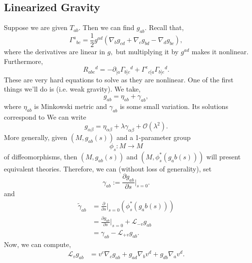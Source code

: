 \documentclass{article}
\numberwithin{equation}{section}
\begin{document}
\subsection{Linearized Gravity}
Suppose we are given $T_{ab}.$ Then we can find $g_{ab}.$ Recall that,
\begin{equation*}
    \Gamma^a{}_{bc} = \frac{1}{2}g^{ad}\left(\nabla_b g_{cd} + \nabla_c g_{bd} - \nabla_d g_{bc}\right),
\end{equation*}
where the derivatives are linear in $g,$ but multiplying it by $g^{ad}$ makes it nonlinear. Furthermore,
\begin{equation*}
    R_{abc}{}^d = -\partial_{[a}\Gamma_{b]c}{}^d + \Gamma^{e}{}_{c[a}\Gamma_{b]e}{}^d.
\end{equation*}
These are very hard equations to solve as they are nonlinear. One of the first things we'll do is  (i.e. weak gravity). We take,
\begin{equation*}
    g_{ab} = \eta_{ab} + \gamma_{ab},
\end{equation*}
where $\eta_{ab}$ is Minkowski metric and $\gamma_{ab}$ is some small variation. Its solutions correspond to  We can write 
\begin{equation*}
    g_{\alpha\beta}=\eta_{\alpha\beta}+\lambda \gamma_{\alpha\beta} + \mathcal{O}(\lambda^2).
\end{equation*}
More generally, given $(M,g_{ab}(s))$ and a 1-parameter group 
\begin{equation*}
    \phi_s:M\to M
\end{equation*}
of diffeomorphisms, then $(M,g_{ab}(s))$ and $(M,\phi^*_s(g_ab(s)))$ will present equivalent theories. Therefore, we can (without loss of generality), set 
\begin{equation*}
    \gamma_{ab} := \frac{\partial g_{ab}}{\partial s}\bigg|_{s=0}.
\end{equation*}
and 
\begin{align*}
    \tilde{\gamma}_{ab} &= \frac{\partial}{\partial s}\bigg|_{s=0}(\phi^*_s(g_ab(s))) \\ 
    &= \frac{\partial g_{ab}}{\partial s}\bigg|_{s=0} + \mathcal{L}_{-v}g_{ab} \\ 
    &= \gamma_{ab} - \mathcal{L}_{+v}g_{ab}.
\end{align*}
Now, we can compute,
\begin{align*}
    \mathcal{L}_vg_{ab} &= v^c\nabla_c g_{ab} + g_{ad}\nabla_b v^d + g_{db} \nabla_a v^{d}.
\end{align*}
\end{document}
